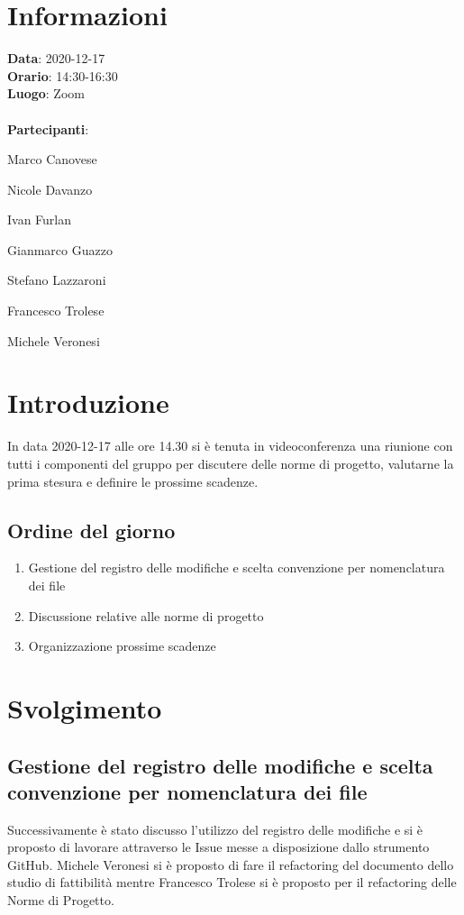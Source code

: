 \section{Informazioni}
\textbf{Data}: 2020-12-17\\
\textbf{Orario}: 14:30-16:30\\
\textbf{Luogo}: Zoom\\\\
\textbf{Partecipanti}:\begin{list}{*}{\setlength{\itemsep}{0cm}}
	\item Marco Canovese
	\item Nicole Davanzo
	\item Ivan Furlan
	\item Gianmarco Guazzo
	\item Stefano Lazzaroni
	\item Francesco Trolese
	\item Michele Veronesi
\end{list}

\section{Introduzione}
In data 2020-12-17 alle ore 14.30 si è tenuta in videoconferenza una riunione con tutti i componenti del gruppo per discutere delle norme di progetto, valutarne la prima stesura e definire le prossime scadenze.
\subsection{Ordine del giorno}
\begin{enumerate}
    \item Gestione del registro delle modifiche e scelta convenzione per nomenclatura dei file
    \item Discussione relative alle norme di progetto
    \item Organizzazione prossime scadenze 
\end{enumerate}

\section{Svolgimento}

\subsection{Gestione del registro delle modifiche e scelta convenzione per nomenclatura dei file}
Successivamente è stato discusso l'utilizzo del registro delle modifiche e si è proposto di lavorare attraverso le Issue messe a disposizione dallo strumento GitHub. Michele Veronesi si è proposto di fare il refactoring del documento  dello studio di fattibilità mentre Francesco Trolese si è proposto per il refactoring delle Norme di Progetto. 

